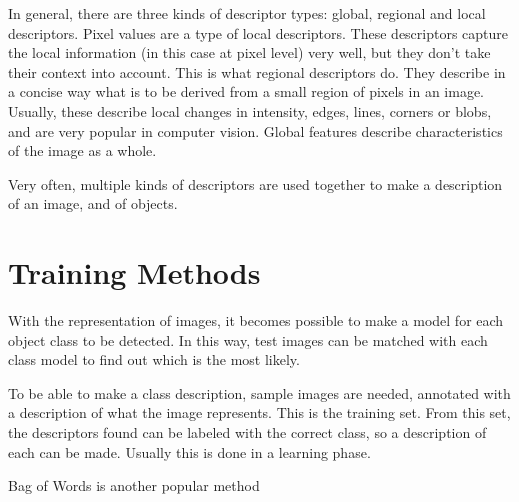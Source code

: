 In general, there are three kinds of descriptor types: global, regional and local descriptors. Pixel values are a type of local descriptors. These descriptors capture the local information (in this case at pixel level) very well, but they don't take their context into account. This is what regional descriptors do. They describe in a concise way what is to be derived from a small region of pixels in an image. Usually, these describe local changes in intensity, edges, lines, corners or blobs, and are very popular in computer vision. Global features describe characteristics of the image as a whole. 

Very often, multiple kinds of descriptors are used together to make a description of an image, and of objects.


\section{Training Methods} %
\label{sub:training_methods}




With the representation of images, it becomes possible to make a model for each object class to be detected. In this way, test images can be matched with each class model to find out which is the most likely.

To be able to make a class description, sample images are needed, annotated with a description of what the image represents. This is the training set. From this set, the descriptors found can be labeled with the correct class, so a description of each can be made. Usually this is done in a learning phase.


Bag of Words is another popular method \cite{lazebnik2006beyond, van2011exploiting} 

